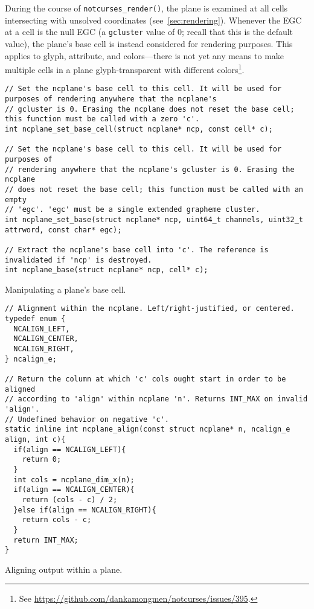During the course of \texttt{notcurses\_render()}, the plane is examined at
all cells intersecting with unsolved coordinates (see~\ref{sec:rendering}).
Whenever the EGC at a cell is the null EGC (a \texttt{gcluster} value of 0;
recall that this is the default value), the plane's base cell is instead
considered for rendering purposes. This applies to glyph, attribute, and
colors---there is not yet any means to make multiple cells in a plane glyph-transparent
with different colors\footnote{See \url{https://github.com/dankamongmen/notcurses/issues/395}.}.

\begin{listing}[!htb]
\begin{verbatim}
// Set the ncplane's base cell to this cell. It will be used for purposes of rendering anywhere that the ncplane's
// gcluster is 0. Erasing the ncplane does not reset the base cell; this function must be called with a zero 'c'.
int ncplane_set_base_cell(struct ncplane* ncp, const cell* c);

// Set the ncplane's base cell to this cell. It will be used for purposes of
// rendering anywhere that the ncplane's gcluster is 0. Erasing the ncplane
// does not reset the base cell; this function must be called with an empty
// 'egc'. 'egc' must be a single extended grapheme cluster.
int ncplane_set_base(struct ncplane* ncp, uint64_t channels, uint32_t attrword, const char* egc);

// Extract the ncplane's base cell into 'c'. The reference is invalidated if 'ncp' is destroyed.
int ncplane_base(struct ncplane* ncp, cell* c);
\end{verbatim}
\caption{Manipulating a plane's base cell.}
\end{listing}

\begin{listing}[!htb]
\begin{verbatim}
// Alignment within the ncplane. Left/right-justified, or centered.
typedef enum {
  NCALIGN_LEFT,
  NCALIGN_CENTER,
  NCALIGN_RIGHT,
} ncalign_e;

// Return the column at which 'c' cols ought start in order to be aligned
// according to 'align' within ncplane 'n'. Returns INT_MAX on invalid 'align'.
// Undefined behavior on negative 'c'.
static inline int ncplane_align(const struct ncplane* n, ncalign_e align, int c){
  if(align == NCALIGN_LEFT){
    return 0;
  }
  int cols = ncplane_dim_x(n);
  if(align == NCALIGN_CENTER){
    return (cols - c) / 2;
  }else if(align == NCALIGN_RIGHT){
    return cols - c;
  }
  return INT_MAX;
}
\end{verbatim}
\caption{Aligning output within a plane.}
\end{listing}

